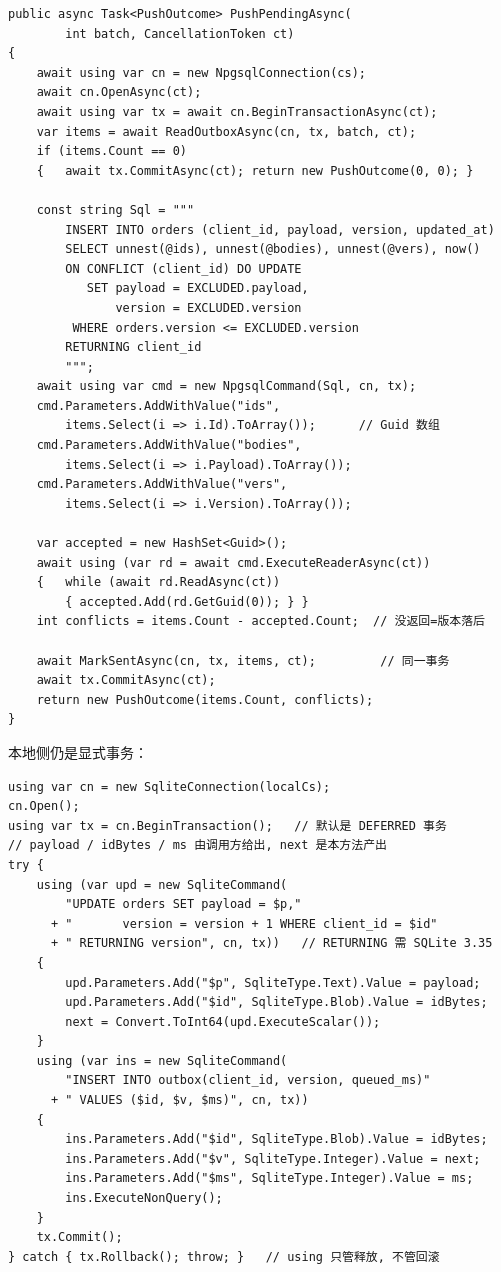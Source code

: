 \documentclass[12pt,a4paper,fontset=fandol]{ctexbook}
\begin{document}
\begin{lstlisting}[style=csharpstyle,caption={C\#：异步推送一批（数组参数展开成多值 upsert）}]
public async Task<PushOutcome> PushPendingAsync(
        int batch, CancellationToken ct)
{
    await using var cn = new NpgsqlConnection(cs);
    await cn.OpenAsync(ct);
    await using var tx = await cn.BeginTransactionAsync(ct);
    var items = await ReadOutboxAsync(cn, tx, batch, ct);
    if (items.Count == 0)
    {   await tx.CommitAsync(ct); return new PushOutcome(0, 0); }

    const string Sql = """
        INSERT INTO orders (client_id, payload, version, updated_at)
        SELECT unnest(@ids), unnest(@bodies), unnest(@vers), now()
        ON CONFLICT (client_id) DO UPDATE
           SET payload = EXCLUDED.payload,
               version = EXCLUDED.version
         WHERE orders.version <= EXCLUDED.version
        RETURNING client_id
        """;
    await using var cmd = new NpgsqlCommand(Sql, cn, tx);
    cmd.Parameters.AddWithValue("ids",
        items.Select(i => i.Id).ToArray());      // Guid 数组
    cmd.Parameters.AddWithValue("bodies",
        items.Select(i => i.Payload).ToArray());
    cmd.Parameters.AddWithValue("vers",
        items.Select(i => i.Version).ToArray());

    var accepted = new HashSet<Guid>();
    await using (var rd = await cmd.ExecuteReaderAsync(ct))
    {   while (await rd.ReadAsync(ct))
        { accepted.Add(rd.GetGuid(0)); } }
    int conflicts = items.Count - accepted.Count;  // 没返回=版本落后

    await MarkSentAsync(cn, tx, items, ct);         // 同一事务
    await tx.CommitAsync(ct);
    return new PushOutcome(items.Count, conflicts);
}
\end{lstlisting}

本地侧仍是显式事务：

\begin{lstlisting}[style=csharpstyle,caption={C\#：本地 SQLite 的显式事务与 outbox}]
using var cn = new SqliteConnection(localCs);
cn.Open();
using var tx = cn.BeginTransaction();   // 默认是 DEFERRED 事务
// payload / idBytes / ms 由调用方给出, next 是本方法产出
try {
    using (var upd = new SqliteCommand(
        "UPDATE orders SET payload = $p,"
      + "       version = version + 1 WHERE client_id = $id"
      + " RETURNING version", cn, tx))   // RETURNING 需 SQLite 3.35
    {
        upd.Parameters.Add("$p", SqliteType.Text).Value = payload;
        upd.Parameters.Add("$id", SqliteType.Blob).Value = idBytes;
        next = Convert.ToInt64(upd.ExecuteScalar());
    }
    using (var ins = new SqliteCommand(
        "INSERT INTO outbox(client_id, version, queued_ms)"
      + " VALUES ($id, $v, $ms)", cn, tx))
    {
        ins.Parameters.Add("$id", SqliteType.Blob).Value = idBytes;
        ins.Parameters.Add("$v", SqliteType.Integer).Value = next;
        ins.Parameters.Add("$ms", SqliteType.Integer).Value = ms;
        ins.ExecuteNonQuery();
    }
    tx.Commit();
} catch { tx.Rollback(); throw; }   // using 只管释放, 不管回滚
\end{lstlisting}
\end{document}
